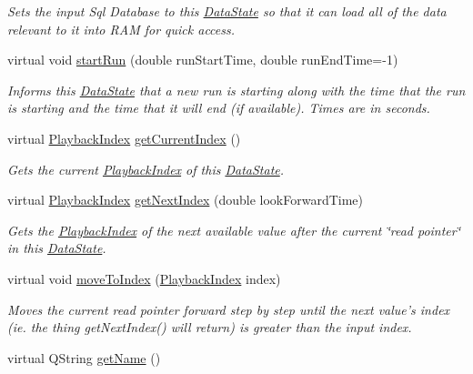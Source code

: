 \begin{DoxyCompactItemize}
\begin{DoxyCompactList}\small\item\em Sets the input Sql Database to this \hyperlink{class_picto_1_1_data_state}{Data\-State} so that it can load all of the data relevant to it into R\-A\-M for quick access. \end{DoxyCompactList}\item 
virtual void \hyperlink{class_picto_1_1_signal_state_a9eb44b06fbfaf30a4be39c01af178bf0}{start\-Run} (double run\-Start\-Time, double run\-End\-Time=-\/1)
\begin{DoxyCompactList}\small\item\em Informs this \hyperlink{class_picto_1_1_data_state}{Data\-State} that a new run is starting along with the time that the run is starting and the time that it will end (if available). Times are in seconds. \end{DoxyCompactList}\item 
virtual \hyperlink{struct_picto_1_1_playback_index}{Playback\-Index} \hyperlink{class_picto_1_1_signal_state_aec41386e0f07f67ed97e03ee9ebc78fc}{get\-Current\-Index} ()
\begin{DoxyCompactList}\small\item\em Gets the current \hyperlink{struct_picto_1_1_playback_index}{Playback\-Index} of this \hyperlink{class_picto_1_1_data_state}{Data\-State}. \end{DoxyCompactList}\item 
virtual \hyperlink{struct_picto_1_1_playback_index}{Playback\-Index} \hyperlink{class_picto_1_1_signal_state_ac2a6f4cb73c06023d7f9fe94a6bb63df}{get\-Next\-Index} (double look\-Forward\-Time)
\begin{DoxyCompactList}\small\item\em Gets the \hyperlink{struct_picto_1_1_playback_index}{Playback\-Index} of the next available value after the current \char`\"{}read pointer\char`\"{} in this \hyperlink{class_picto_1_1_data_state}{Data\-State}. \end{DoxyCompactList}\item 
virtual void \hyperlink{class_picto_1_1_signal_state_a0b2ecb912382f2e5605d24ffaca7a093}{move\-To\-Index} (\hyperlink{struct_picto_1_1_playback_index}{Playback\-Index} index)
\begin{DoxyCompactList}\small\item\em Moves the current read pointer forward step by step until the next value's index (ie. the thing get\-Next\-Index() will return) is greater than the input index. \end{DoxyCompactList}\item 
\hypertarget{class_picto_1_1_signal_state_a2482add59b241eaa8b0cbe87a90c48a6}{virtual Q\-String \hyperlink{class_picto_1_1_signal_state_a2482add59b241eaa8b0cbe87a90c48a6}{get\-Name} ()}\label{class_picto_1_1_signal_state_a2482add59b241eaa8b0cbe87a90c48a6}


\end{DoxyCompactItemize}
